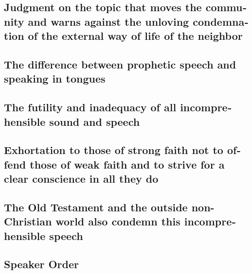 \begin{paracol}{2}
\begin{otherlanguage}{english}
{\subsection{Judgment on the topic that moves the community and warns
against the unloving condemnation of the external way of life of the
neighbor}\label{judgment-on-the-topic-that-moves-the-community-and-warns-against-the-unloving-condemnation-of-the-external-way-of-life-of-the-neighbor}}

\hypertarget{the-difference-between-prophetic-speech-and-speaking-in-tongues}{%
\subsection{The difference between prophetic speech and speaking in
tongues}\label{the-difference-between-prophetic-speech-and-speaking-in-tongues}}

\hypertarget{the-futility-and-inadequacy-of-all-incomprehensible-sound-and-speech}{%
\subsection{The futility and inadequacy of all incomprehensible sound
and
speech}\label{the-futility-and-inadequacy-of-all-incomprehensible-sound-and-speech}}

\hypertarget{exhortation-to-those-of-strong-faith-not-to-offend-those-of-weak-faith-and-to-strive-for-a-clear-conscience-in-all-they-do}{%
\subsection{Exhortation to those of strong faith not to offend those of
weak faith and to strive for a clear conscience in all they
do}\label{exhortation-to-those-of-strong-faith-not-to-offend-those-of-weak-faith-and-to-strive-for-a-clear-conscience-in-all-they-do}}

\hypertarget{the-old-testament-and-the-outside-non-christian-world-also-condemn-this-incomprehensible-speech}{%
\subsection{The Old Testament and the outside non-Christian world also
condemn this incomprehensible
speech}\label{the-old-testament-and-the-outside-non-christian-world-also-condemn-this-incomprehensible-speech}}

\hypertarget{speaker-order}{%
\subsection{Speaker Order}\label{speaker-order}}


\end{otherlanguage}
\end{paracol}
